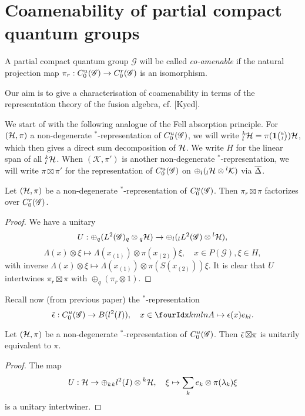 \section{Coamenability of partial compact quantum groups}

\begin{Def} A partial compact quantum group $\mathscr{G}$ will be called \emph{co-amenable} if the natural projection map $\pi_r:C^{u}_{0}(\mathscr{G})\rightarrow C^{r}_{0}(\mathscr{G})$ is an isomorphism.
\end{Def}

Our aim is to give a characterisation of coamenability in terms of the representation theory of the fusion algebra, cf. [Kyed].

We start of with the following analogue of the Fell absorption principle. For $(\mathcal{H},\pi)$ a non-degenerate $^*$-representation of $C^{u}_{0}(\mathscr{G})$, we will write ${}^{k}_{l}\mathcal{H} = \pi(\mathbf{1}{\tiny {\begin{pmatrix} k\\l\end{pmatrix}}})\mathcal{H}$, which then gives a direct sum decomposition of $\mathcal{H}$. We write $H$ for the linear span of all ${}^{k}_{l}\mathcal{H}$. When $(\mathcal{K},\pi')$ is another non-degenerate $^*$-representation, we will write $\pi \boxtimes \pi'$ for the representation of $C^{u}_{0}(\mathscr{G})$ on $\oplus_l ({}_l\mathcal{H}\otimes {}^l\mathcal{K})$ via $\overline{\Delta}$.

\begin{Lem} Let $(\mathcal{H},\pi)$ be a non-degenerate $^*$-representation of $C^{u}_{0}(\mathscr{G})$. Then $\pi_r\boxtimes \pi$ factorizes over $C^{r}_{0}(\mathscr{G})$.
\end{Lem}

\begin{proof}  We have a unitary \[U: \oplus_q (L^2(\mathscr{G})_q\otimes {}_q\mathcal{H} ) \rightarrow \oplus_l ({}_l L^2(\mathscr{G})\otimes {}^l\mathcal{H}),\]\[\Lambda(x)\otimes \xi \mapsto \Lambda(x_{(1)})\otimes \pi(x_{(2)})\xi,\quad x\in P(\mathscr{G}),\xi\in H,\] with inverse $\Lambda(x)\otimes \xi \mapsto \Lambda(x_{(1)})\otimes \pi(S(x_{(2)}))\xi$. It is clear that $U$ intertwines $\pi_r\boxtimes \pi$ with $\oplus_q (\pi_r\otimes 1)$.
\end{proof} 

Recall now (from previous paper) the $^*$-representation \[\weps: \CuG \rightarrow B(l^2(I)), \quad x\in \Gr{A}{k}{l}{m}{n}\mapsto \epsilon(x) e_{kl}.\]

\begin{Lem}\label{LemUnit} Let $(\mathcal{H},\pi)$ be a non-degenerate $^*$-representation of $C^{u}_{0}(\mathscr{G})$. Then $\operatorname{\tilde{\epsilon}}\boxtimes \pi$ is unitarily equivalent to $\pi$.
\end{Lem} 
\begin{proof} The map \[U: \mathcal{H} \rightarrow \oplus_k {}_kl^2(I)\otimes {}^k\mathcal{H},\quad \xi \mapsto \sum_k e_k\otimes \pi(\lambda_k)\xi\] is a unitary intertwiner.
\end{proof} 

